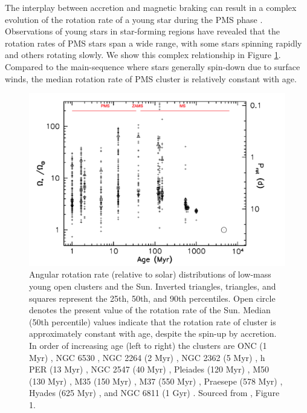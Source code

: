 The interplay between accretion and magnetic braking can result in a complex evolution of the rotation rate of a young star during the PMS phase \citep{gallet_improved_2013}.
Observations of young stars in star-forming regions have revealed that the rotation rates of PMS stars span a wide range, with some stars spinning rapidly and others rotating slowly.
We show this complex relationship in Figure \ref{fig:pms_ms_evo}.
Compared to the main-sequence where stars generally spin-down due to surface winds, the median rotation rate of PMS cluster is relatively constant with age.

\begin{figure}
    \includegraphics[width=\textwidth]{Figures/intro_figures/pms_evo.png}
    \caption[Angular rotation rate distributions of low-mass young open clusters and the Sun over time.]{Angular rotation rate (relative to solar) distributions of low-mass young open clusters and the Sun. Inverted triangles, triangles, and squares represent the 25th, 50th, and 90th percentiles. Open circle denotes the present value of the rotation rate of the Sun. Median (50th percentile) values indicate that the rotation rate of cluster is approximately constant with age, despite the spin-up by accretion. In order of increasing age (left to right) the clusters are ONC (1 Myr) \citep{herbst_stellar_2002}, NGC 6530 \citep{henderson_time-series_2012}, NGC 2264 (2 Myr) \citep{affer_rotation_2013}, NGC 2362 (5 Myr) \citep{irwin_monitor_2008}, h PER (13 Myr) \citep{moraux_monitor_2013}, NGC 2547 (40 Myr) \citep{irwin_monitor_2008}, Pleiades (120 Myr) \citep{hartman_large_2010}, M50 (130 Myr) \citep{irwin_monitor_2009}, M35 (150 Myr) \citep{meibom_slar_2009}, M37 (550 Myr) \citep{hartman_deep_2009}, Praesepe (578 Myr) \citep{delorme_stellar_2011}, Hyades (625 Myr) \citep{delorme_stellar_2011}, and NGC 6811 (1 Gyr) \citep{meibom_kepler_2011}.  Sourced from \citet{gallet_improved_2013},  Figure 1.}
    \label{fig:pms_ms_evo}
\end{figure}


